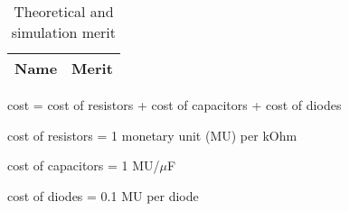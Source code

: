 \vspace{0.3in}
\begin{table}[H]
  \centering
  \begin{tabular}{|l|r|}
    \hline    
    {\bf Name} & {\bf Merit} \\ \hline
    
  \end{tabular}
  \caption{Theoretical and simulation merit}
  \label{tab:8}
\end{table}

cost = cost of resistors + cost of capacitors + cost of diodes

cost of resistors = 1 monetary unit (MU) per kOhm

cost of capacitors = 1 MU/$\mu$F

cost of diodes = 0.1 MU per diode
\paragraph{}
